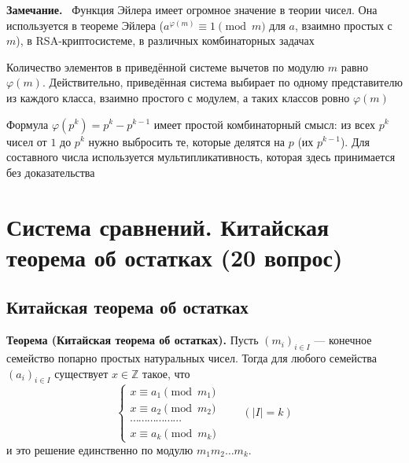 \documentclass[a4paper,12pt]{article}
\newcommand{\myremark}{\textbf{Замечание.}\ }
\theoremstyle{definition}
\theoremstyle{plain}
\theoremstyle{remark}
\begin{document}
	\myremark
	Функция Эйлера имеет огромное значение в теории чисел. Она используется в теореме Эйлера ($a^{\varphi(m)} \equiv 1 \pmod{m}$ для $a$, взаимно простых с $m$), в RSA-криптосистеме, в различных комбинаторных задачах
	
	\begin{tcolorbox}[colback=purple!5, colframe=purple!50!black, title=Заметочка: Связь с приведённой системой]
		Количество элементов в приведённой системе вычетов по модулю $m$ равно $\varphi(m)$. Действительно, приведённая система выбирает по одному представителю из каждого класса, взаимно простого с модулем, а таких классов ровно $\varphi(m)$
	\end{tcolorbox}
	
	\begin{tcolorbox}[colback=yellow!5, colframe=orange!60!black, title=Важное замечание]
		Формула $\varphi(p^k) = p^k - p^{k-1}$ имеет простой комбинаторный смысл: из всех $p^k$ чисел от $1$ до $p^k$ нужно выбросить те, которые делятся на $p$ (их $p^{k-1}$). Для составного числа используется мультипликативность, которая здесь принимается без доказательства
	\end{tcolorbox}
	
	
	
	
	\newpage
	\section{Система сравнений. Китайская теорема об остатках (20 вопрос)}
	
	\subsection{Китайская теорема об остатках}
	
	\noindent \textbf{Теорема (Китайская теорема об остатках).}
	Пусть $(m_i)_{i \in I}$ — конечное семейство попарно простых натуральных чисел. Тогда для любого семейства $(a_i)_{i \in I}$ существует $x \in \mathbb{Z}$ такое, что
	\[
	\begin{cases}
		x \equiv a_1 \pmod{m_1} \\
		x \equiv a_2 \pmod{m_2} \\
		\cdots\cdots\cdots\cdots\cdots\cdots \\
		x \equiv a_k \pmod{m_k}
	\end{cases}
	\qquad (|I| = k)
	\]
	и это решение единственно по модулю $m_1 m_2 \dots m_k$.
	
\end{document}
